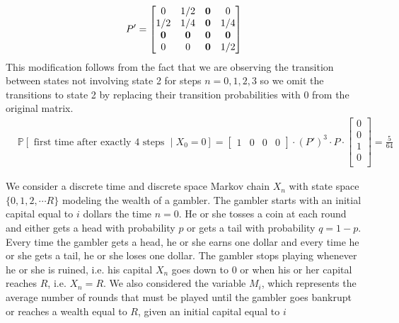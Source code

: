 \documentclass[12pt,twoside, letter]{exam}
\theoremstyle{definition}
\newcommand{\pp}{\mathbb{P}}
\begin{document}
\begin{enumerate}
\begin{solution}
\begin{align*}
        &P' =
        \begin{bmatrix}
          0 & 1/2 & {\bf 0} & 0 \\
          1/2 & 1/4 & {\bf 0} & 1/4 \\
          {\bf 0} & {\bf 0} & {\bf 0} & {\bf 0} \\
          0 & 0 & {\bf 0} & 1/2
        \end{bmatrix} \\
      \end{align*}
        This modification follows from the fact that we are observing the transition between states not involving state 2 for steps $n = 0, 1, 2, 3$ so we omit the transitions
        to state 2 by replacing their transition probabilities with 0 from the original matrix.
      \begin{align*}
        &\pp[\text{ first time after exactly 4 steps } \mid X_0 = 0] =
        \begin{bmatrix}
          1 & 0 & 0 & 0
        \end{bmatrix}
        \cdot (P')^{3} \cdot P\cdot
        \begin{bmatrix}
          0 \\
          0 \\
          1 \\
          0 \\
        \end{bmatrix} = \frac{5}{64}
      \end{align*}
    \end{solution}
\end{enumerate}


\par{We consider a discrete time and discrete space Markov chain $X_n$ with state space $\{0, 1, 2, \cdots R\}$ modeling the wealth of a gambler.
The gambler starts with an initial capital equal to $i$ dollars the time $n=0$. He or she tosses a coin at each round and either gets a head with probability $p$
or gets a tail with probability $q = 1 - p$. Every time the gambler gets a head, he or she earns one dollar and every time he or she gets a tail, he or she
loses one dollar. The gambler stops playing whenever he or she is ruined, i.e. his capital $X_n$ goes down to 0 or when his or her capital reaches $R$, i.e.
$X_n = R$. We also considered the variable $M_i$, which represents the average number of rounds that must be played until the gambler goes bankrupt or reaches
a wealth equal to $R$, given an initial capital equal to $i$}
\end{document}
